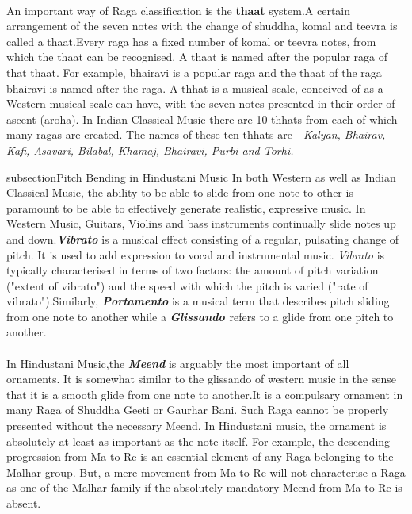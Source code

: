 \documentclass[12pt,a4paper]{article}
\begin{document}
\paragraph{}
An important way of Raga classification is the {\textbf{thaat}} system.A certain arrangement of the seven notes with the change of shuddha, komal and teevra is called a thaat.Every raga has a fixed number of komal or teevra notes, from which the thaat can be recognised. A thaat is named after the popular raga of that thaat. For example, bhairavi is a popular raga and the thaat of the raga bhairavi is named after the raga. A thhat is a musical scale, conceived of as a Western musical scale can have, with the seven notes presented in their order of ascent (aroha). In Indian Classical Music there are 10 thhats from each of which many ragas are created. The names of these ten thhats are - {\em{Kalyan, Bhairav, Kafi, Asavari, Bilabal, Khamaj, Bhairavi, Purbi and Torhi.}}

subsection{Pitch Bending in Hindustani Music}
In both Western as well as Indian Classical Music, the ability to be able to slide from one note to other is paramount to be able to effectively generate realistic, expressive music. In Western Music, Guitars, Violins and bass instruments continually slide notes up and down.\textbf {\em{Vibrato}} is a musical effect consisting of a regular, pulsating change of pitch. It is used to add expression to vocal and instrumental music. {\em{Vibrato}} is typically characterised in terms of two factors: the amount of pitch variation ("extent of vibrato") and the speed with which the pitch is varied ("rate of vibrato").Similarly, \textbf {\em{Portamento}} is a musical term that describes pitch sliding from one note to another while a \textbf {\em{Glissando }}refers to a glide from one pitch to another. \paragraph{}
In Hindustani Music,the \textbf{\em{Meend}} is arguably the most important of all ornaments. It is somewhat similar to the glissando of western music in the sense that it is a smooth glide from one note to another.It is a compulsary ornament in many Raga of Shuddha Geeti or Gaurhar Bani. Such Raga cannot be properly presented without the necessary Meend. In Hindustani music, the ornament is absolutely at least as important as the note itself. For example, the descending progression from Ma to Re is an essential element of any Raga belonging to the Malhar group. But, a mere movement from Ma to Re will not characterise a Raga as one of the Malhar family if the absolutely mandatory Meend from Ma to Re is absent.
\end{document}

